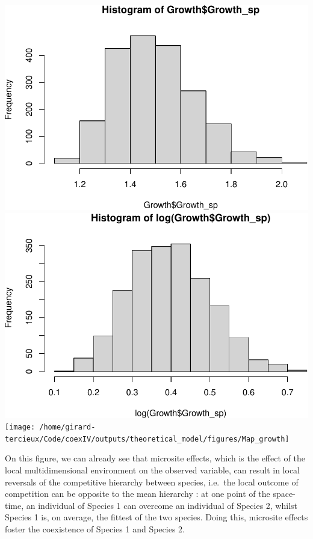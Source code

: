 \documentclass[
]{article}
\newenvironment{Shaded}{\begin{snugshade}}{\end{snugshade}}
\newcommand{\KeywordTok}[1]{\textcolor[rgb]{0.13,0.29,0.53}{\textbf{#1}}}
\newcommand{\NormalTok}[1]{#1}
\newcommand{\OperatorTok}[1]{\textcolor[rgb]{0.81,0.36,0.00}{\textbf{#1}}}
\newcommand{\StringTok}[1]{\textcolor[rgb]{0.31,0.60,0.02}{#1}}
\begin{document}
\includegraphics{theoretical_model_files/figure-latex/Growth plots-7.pdf}
\includegraphics{theoretical_model_files/figure-latex/Growth plots-8.pdf}
\texttt{[image: /home/girard-tercieux/Code/coexIV/outputs/theoretical\_model/figures/Map\_growth]}

On this figure, we can already see that microsite effects, which is the
effect of the local multidimensional environment on the observed
variable, can result in local reversals of the competitive hierarchy
between species, i.e.~the local outcome of competition can be opposite
to the mean hierarchy : at one point of the space-time, an individual of
Species 1 can overcome an individual of Species 2, whilst Species 1 is,
on average, the fittest of the two species. Doing this, microsite
effects foster the coexistence of Species 1 and Species 2.

\begin{Shaded}
\end{Shaded}
\end{document}
